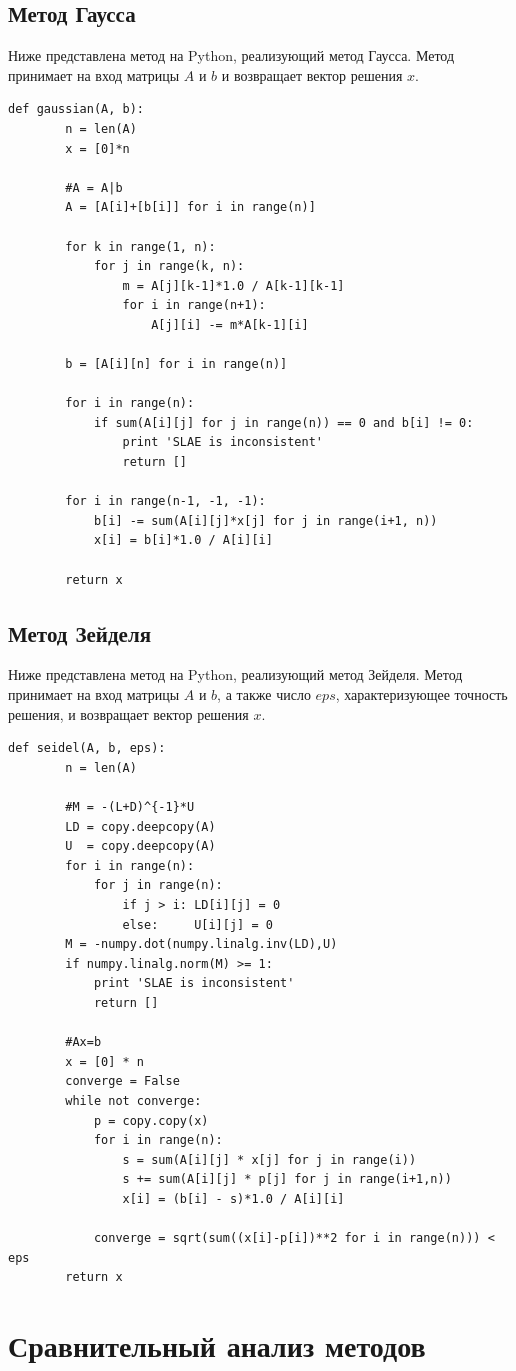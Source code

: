 \documentclass[12pt,a4paper,oneside]{extarticle}
\begin{document}
    \subsection{Метод Гаусса}
    Ниже представлена метод на Python, реализующий метод Гаусса. Метод принимает на вход матрицы $A$ и $b$ и возвращает вектор решения $x$.
    \lstset{language=Python}
        \begin{lstlisting}[mathescape] 
    def gaussian(A, b):
        n = len(A)    
        x = [0]*n

        #A = A|b
        A = [A[i]+[b[i]] for i in range(n)]

        for k in range(1, n):
            for j in range(k, n):
                m = A[j][k-1]*1.0 / A[k-1][k-1]
                for i in range(n+1):
                    A[j][i] -= m*A[k-1][i]

        b = [A[i][n] for i in range(n)]

        for i in range(n):
            if sum(A[i][j] for j in range(n)) == 0 and b[i] != 0:
                print 'SLAE is inconsistent'
                return []

        for i in range(n-1, -1, -1):
            b[i] -= sum(A[i][j]*x[j] for j in range(i+1, n))
            x[i] = b[i]*1.0 / A[i][i]
     
        return x
    \end{lstlisting}

    \subsection{Метод Зейделя}
    Ниже представлена метод на Python, реализующий метод Зейделя. Метод принимает на вход матрицы $A$ и $b$, а также число $eps$, характеризующее точность решения, и возвращает вектор решения $x$.

    \lstset{language=Python}
        \begin{lstlisting}[mathescape] 
    def seidel(A, b, eps):
        n = len(A)

        #M = -(L+D)^{-1}*U
        LD = copy.deepcopy(A)
        U  = copy.deepcopy(A)
        for i in range(n):
            for j in range(n):
                if j > i: LD[i][j] = 0
                else:     U[i][j] = 0
        M = -numpy.dot(numpy.linalg.inv(LD),U)
        if numpy.linalg.norm(M) >= 1:
            print 'SLAE is inconsistent'
            return []

        #Ax=b    
        x = [0] * n
        converge = False
        while not converge:
            p = copy.copy(x)
            for i in range(n):
                s = sum(A[i][j] * x[j] for j in range(i))
                s += sum(A[i][j] * p[j] for j in range(i+1,n))
                x[i] = (b[i] - s)*1.0 / A[i][i]
     
            converge = sqrt(sum((x[i]-p[i])**2 for i in range(n))) < eps
        return x
    \end{lstlisting}

\section{Сравнительный анализ методов}
    
\end{document}
